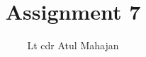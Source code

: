 \documentclass[journal,12pt,twocolumn]{IEEEtran}
\begin{document}
\makeatletter
{}
\makeatother
\let\StandardTheFigure\thefigure
\let\vec\mathbf
\renewcommand{\thefigure}{\theproblem}
\def\putbox#1#2#3{\makebox[0in][l]{\makebox[#1][l]{}\raisebox{\baselineskip}[0in][0in]{\raisebox{#2}[0in][0in]{#3}}}}
     \def\rightbox#1{\makebox[0in][r]{#1}}
     \def\centbox#1{\makebox[0in]{#1}}
     \def\topbox#1{\raisebox{-\baselineskip}[0in][0in]{#1}}
     \def\midbox#1{\raisebox{-0.5\baselineskip}[0in][0in]{#1}}
\vspace{3cm}
\title{Assignment 7}
\author{Lt cdr Atul Mahajan}
%
%
%
% 
%
\end{document}
